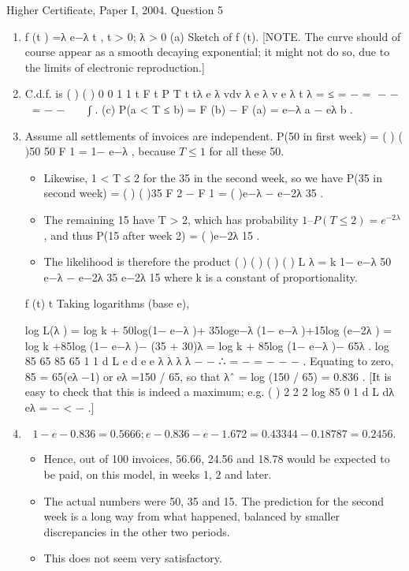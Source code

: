 \documentclass[a4paper,12pt]{article}
\begin{document}
Higher Certificate, Paper I, 2004. Question 5

\begin{enumerate}
\item  f (t ) =λ e−λ t , t > 0; λ > 0
(a) Sketch of f (t).
[NOTE. The curve should of course appear as a smooth decaying exponential;
it might not do so, due to the limits of electronic reproduction.]
\item C.d.f. is ( ) ( ) 0
0
1 1
t
F t P T t tλ e λ vdv λ e λ v e λ t
λ
= ≤ = − = − −  = − −   ∫ .
(c) P(a < T ≤ b) = F (b) − F (a) = e−λ a − eλ b .
\item Assume all settlements of invoices are independent.
P(50 in first week) = { ( )} ( )50 50 F 1 = 1− e−λ , because $T \leq 1$ for all these 50.

\begin{itemize}
\item Likewise, 1 < T ≤ 2 for the 35 in the second week, so we have P(35 in second week) =
{ ( ) ( )}35 F 2 − F 1 = ( )e−λ − e−2λ 35 .
\item The remaining 15 have T > 2, which has probability $1 – P(T \leq 2) = e^{−2\lambda}$ , and thus
P(15 after week 2) = ( )e−2λ 15 .
\item The likelihood is therefore the product
( ) ( ) ( ) ( ) L λ = k 1− e−λ 50 e−λ − e−2λ 35 e−2λ 15
where k is a constant of proportionality.
\end{itemize}

f (t)
t
Taking logarithms (base e),

log L(λ ) = log k + 50log(1− e−λ )+ 35log{e−λ (1− e−λ )}+15log (e−2λ )
= log k +85log (1− e−λ )− (35 + 30)λ = log k + 85log (1− e−λ )− 65λ .
log 85 65 85 65
1 1
d L e
d e e
λ
λ λ λ
−
− ∴ = − = −
− −
.
Equating to zero, 85 = 65(eλ −1) or eλ =150 / 65, so that λˆ = log (150 / 65) = 0.836 .
[It is easy to check that this is indeed a maximum; e.g. ( )
2
2 2
log 85 0
1
d L
dλ eλ
= − <
−
.]
\item  \[1− e−0.836 = 0.5666; e−0.836 − e−1.672 = 0.43344 − 0.18787 = 0.2456 . \]

\begin{itemize}
\item Hence, out
of 100 invoices, 56.66, 24.56 and 18.78 would be expected to be paid, on this model,
in weeks 1, 2 and later. 
\item The actual numbers were 50, 35 and 15. The prediction for
the second week is a long way from what happened, balanced by smaller
discrepancies in the other two periods. 
\item This does not seem very satisfactory.
\end{itemize}
\end{enumerate}
\end{document}

